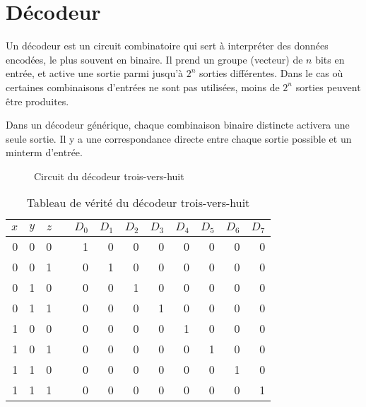 \documentclass[letter, oneside]{book}
\begin{document}
\section{Décodeur}
\label{sec:orgdf9f378}

Un décodeur est un circuit combinatoire qui sert à interpréter des
données encodées, le plus souvent en binaire. Il prend un groupe
(vecteur) de \(n\) bits en entrée, et active une sortie parmi jusqu'à
\(2^n\) sorties différentes. Dans le cas où certaines combinaisons
d'entrées ne sont pas utilisées, moins de \(2^n\) sorties peuvent être
produites.

Dans un décodeur générique, chaque combinaison binaire distincte
activera une seule sortie. Il y a une correspondance directe entre
chaque sortie possible et un minterm d'entrée.

\begin{figure}[htbp]
\centering

\caption{\label{fig:orgf95f81e}Circuit du décodeur trois-vers-huit}
\end{figure}


\begin{table}[htbp]
\caption{\label{tab:org0c63dca}Tableau de vérité du décodeur trois-vers-huit}
\centering
\begin{tabular}{rrrlrrrrrrrr}
\(x\) & \(y\) & \(z\) &  & \(D_0\) & \(D_1\) & \(D_2\) & \(D_3\) & \(D_4\) & \(D_5\) & \(D_6\) & \(D_7\)\\[0pt]
\hline
0 & 0 & 0 &  & 1 & 0 & 0 & 0 & 0 & 0 & 0 & 0\\[0pt]
0 & 0 & 1 &  & 0 & 1 & 0 & 0 & 0 & 0 & 0 & 0\\[0pt]
0 & 1 & 0 &  & 0 & 0 & 1 & 0 & 0 & 0 & 0 & 0\\[0pt]
0 & 1 & 1 &  & 0 & 0 & 0 & 1 & 0 & 0 & 0 & 0\\[0pt]
1 & 0 & 0 &  & 0 & 0 & 0 & 0 & 1 & 0 & 0 & 0\\[0pt]
1 & 0 & 1 &  & 0 & 0 & 0 & 0 & 0 & 1 & 0 & 0\\[0pt]
1 & 1 & 0 &  & 0 & 0 & 0 & 0 & 0 & 0 & 1 & 0\\[0pt]
1 & 1 & 1 &  & 0 & 0 & 0 & 0 & 0 & 0 & 0 & 1\\[0pt]
\end{tabular}
\end{table}
\end{document}
